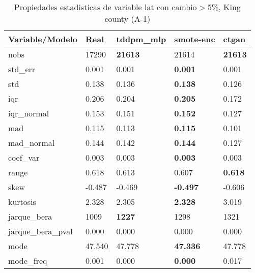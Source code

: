 \begin{table}[H]
\centering
\fontsize{8}{14}\selectfont
\caption{Propiedades estadisticas de variable lat con cambio\ensuremath{>}5\%, King county (A-1)}
\label{table-stats-king county-a-1-lat-short}
\begin{tabular}{|l|m{10em}|m{10em}|m{10em}|m{10em}|}
\hline
 \rowcolor[gray]{0.8}
Variable/Modelo & Real & tddpm\_mlp & smote-enc & ctgan \\
\hline nobs & 17290 & \bfseries 21613 & \cellcolor[rgb]{0.9, 0.54, 0.52} 21614 & \bfseries 21613 \\
\hline std\_err & 0.001 & 0.001 & \bfseries 0.001 & \cellcolor[rgb]{0.9, 0.54, 0.52} 0.001 \\
\hline std & 0.138 & 0.136 & \bfseries 0.138 & \cellcolor[rgb]{0.9, 0.54, 0.52} 0.126 \\
\hline iqr & 0.206 & 0.204 & \bfseries 0.205 & \cellcolor[rgb]{0.9, 0.54, 0.52} 0.172 \\
\hline iqr\_normal & 0.153 & 0.151 & \bfseries 0.152 & \cellcolor[rgb]{0.9, 0.54, 0.52} 0.127 \\
\hline mad & 0.115 & 0.113 & \bfseries 0.115 & \cellcolor[rgb]{0.9, 0.54, 0.52} 0.101 \\
\hline mad\_normal & 0.144 & 0.142 & \bfseries 0.144 & \cellcolor[rgb]{0.9, 0.54, 0.52} 0.127 \\
\hline coef\_var & 0.003 & 0.003 & \bfseries 0.003 & \cellcolor[rgb]{0.9, 0.54, 0.52} 0.003 \\
\hline range & 0.618 & 0.613 & \cellcolor[rgb]{0.9, 0.54, 0.52} 0.607 & \bfseries 0.618 \\
\hline skew & -0.487 & -0.469 & \bfseries -0.497 & \cellcolor[rgb]{0.9, 0.54, 0.52} -0.606 \\
\hline kurtosis & 2.328 & 2.305 & \bfseries 2.328 & \cellcolor[rgb]{0.9, 0.54, 0.52} 3.019 \\
\hline jarque\_bera & 1009 & \bfseries 1227 & 1298 & \cellcolor[rgb]{0.9, 0.54, 0.52} 1321 \\
\hline jarque\_bera\_pval & 0.000 & 0.000 & 0.000 & 0.000 \\
\hline mode & 47.540 & \cellcolor[rgb]{0.9, 0.54, 0.52} 47.778 & \bfseries 47.336 & \cellcolor[rgb]{0.9, 0.54, 0.52} 47.778 \\
\hline mode\_freq & 0.001 & 0.000 & \bfseries 0.000 & \cellcolor[rgb]{0.9, 0.54, 0.52} 0.017 \\
\hline
\end{tabular}
\end{table}
